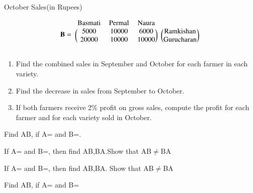 \begin{center}
October Sales(in Rupees)
\end{center}
\begin{align}
    \vec{B} =
    \begin{blockarray}{cccc}
    \text{Basmati} & \text{Permal} & \text{Naura} \\
    \begin{block}{(ccc)(c)}
    5000 & 10000 & 6000 & \text{Ramkishan}\\
    20000 & 10000 & 10000 & \text{Gurucharan} \\
    \end{block}
    \end{blockarray}
\end{align}

\begin{enumerate}
    \item Find the combined sales in September and October for each farmer in each variety.
    \item Find the decrease in sales from September to October.
    \item If both farmers receive 2\% profit on gross sales, compute the profit for each farmer and for each variety sold in October.
\end{enumerate}
%
\solution

   
    \item  Find AB, if A= and B=.\\
    \item  If A= and B=, then find AB,BA.Show that AB$\neq$BA

   
     \item If A= and  B=, then find AB,BA. Show that AB$\neq$BA\\
     
   
    \item Find AB, if A= and B=\\
     
